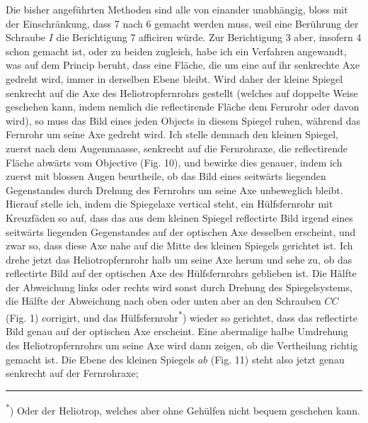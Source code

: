 \par\noindent\hspace*{\parindent}Die bisher angeführten Methoden sind alle von einander unabhängig, bloss mit der Einschränkung, dass 7 nach 6 gemacht werden muss, weil eine Berührung der Schraube $I$ die Berichtigung 7 afficiren würde. Zur Berichtigung 3 aber, insofern 4 schon gemacht ist, oder zu beiden zugleich, habe ich ein Verfahren angewandt, was auf dem Princip beruht, dass eine Fläche, die um eine auf ihr senkrechte Axe gedreht wird, immer in derselben Ebene bleibt. Wird daher der kleine Spiegel senkrecht auf die Axe des Heliotropfernrohrs gestellt (welches auf doppelte Weise geschehen kann, indem nemlich die reflectirende Fläche dem Fernrohr  oder davon  wird), so muss das Bild eines jeden Objects in diesem Spiegel ruhen, während das Fernrohr um seine Axe gedreht wird. Ich stelle demnach den kleinen Spiegel, zuerst nach dem Augenmaasse, senkrecht auf die Fernrohraxe, die reflectirende Fläche abwärts vom Objective (Fig. 10), und bewirke dies genauer, indem ich zuerst mit blossen Augen beurtheile, ob das Bild eines seitwärts liegenden Gegenstandes durch Drehung des Fernrohrs um seine Axe unbeweglich bleibt. Hierauf stelle ich, indem die Spiegelaxe vertical steht, ein Hülfsfernrohr mit Kreuzfäden so auf, dass das aus dem kleinen Spiegel reflectirte Bild irgend eines seitwärts liegenden Gegenstandes auf der optischen Axe desselben erscheint, und zwar so, dass diese Axe nahe auf die Mitte des kleinen Spiegels gerichtet ist. Ich drehe jetzt das Heliotropfernrohr halb um seine Axe herum und sehe zu, ob das reflectirte Bild auf der optischen Axe des Hülfsfernrohrs geblieben ist. Die Hälfte der Abweichung links oder rechts wird sonst durch Drehung des Spiegelsystems, die Hälfte der Abweichung nach oben oder unten aber an den Schrauben $CC$ (Fig. 1) corrigirt, und das Hülfsfernrohr\textsuperscript{*}) wieder so gerichtet, dass das reflectirte Bild genau auf der optischen Axe erscheint. Eine abermalige halbe Umdrehung des Heliotropfernrohrs um seine Axe wird dann zeigen, ob die Vertheilung richtig gemacht ist. Die Ebene des kleinen Spiegels $ab$ (Fig. 11) steht also jetzt genau senkrecht auf der Fernrohraxe;
\par\medskip\noindent\rule{4cm}{.4pt}\par
\begingroup\footnotesize\noindent\hspace*{\parindent}\textsuperscript{*}) Oder der Heliotrop, welches aber ohne Gehülfen nicht bequem geschehen kann.\par\endgroup
\par\medskip\noindent\makebox[.86\linewidth][r]{60\textsuperscript{*}}\par

